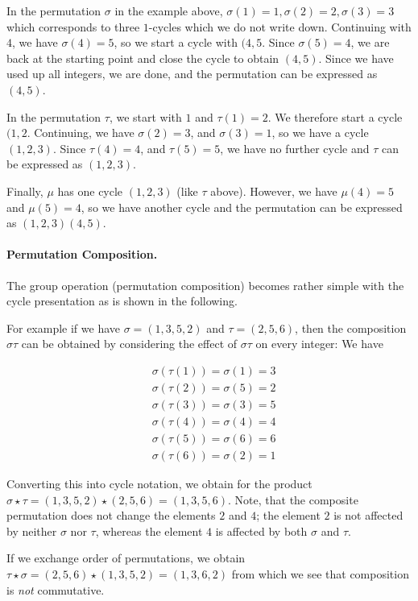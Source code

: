 In the permutation $\sigma$ in the example above, $\sigma(1) = 1, \sigma(2) = 2, \sigma(3) = 3$ which corresponds to three  $1$-cycles which we do not write down. Continuing with $4$, we have $\sigma(4) = 5$, so we start a cycle with $(4, 5$. Since $\sigma(5) = 4$, we are back at the starting point and close the cycle to obtain $(4,5)$. Since we have used up all integers, we are done, and the permutation can be expressed as $(4,5)$.

In the permutation $\tau$, we start with $1$ and $\tau(1) = 2$. We therefore start a cycle $(1,2$. Continuing, we have $\sigma(2) = 3$, and $\sigma(3) = 1$, so we have a cycle $(1,2,3)$. Since $\tau(4) = 4$, and $\tau(5) = 5$, we have no further cycle and $\tau$ can be expressed as $(1,2,3)$.

Finally, $\mu$ has one cycle $(1,2,3)$ (like $\tau$ above). However, we have $\mu(4) = 5$ and $\mu(5) = 4$, so we have another cycle and the permutation can be expressed as  $(1,2,3)(4,5)$.

\paragraph{Permutation Composition.} The group operation (permutation composition) becomes rather simple with the cycle presentation as is shown in the following. 

For example if we have $\sigma=(1,3,5,2)$ and $\tau = (2,5,6)$, then the composition $\sigma \tau$ can be obtained by considering the effect of $\sigma \tau$ on every integer: We have

\begin{align*}
  &\sigma (\tau (1)) = \sigma(1) = 3 \\
  &\sigma (\tau (2)) = \sigma(5) = 2 \\
  &\sigma (\tau (3)) = \sigma(3) = 5 \\
  &\sigma (\tau (4)) = \sigma(4) = 4 \\
  &\sigma (\tau (5)) = \sigma(6) = 6 \\
  &\sigma (\tau (6)) = \sigma(2) = 1
\end{align*}

Converting this into cycle notation, we obtain for the product $\sigma \star \tau = (1,3,5,2) \star (2,5,6) = (1,3,5,6)$. Note, that the composite permutation does not change the elements $2$ and $4$; the element $2$ is not affected by neither $\sigma$ nor $\tau$, whereas the element $4$ is affected by both $\sigma$ and $\tau$.

If we exchange order of permutations, we obtain $\tau \star \sigma = (2,5,6) \star (1,3,5,2) = (1,3,6,2)$ from which we see that composition is \emph{not} commutative.

